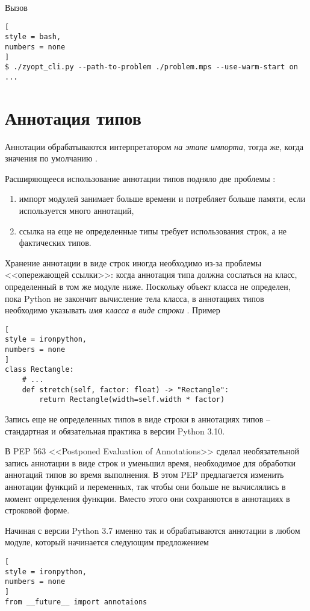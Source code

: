 \documentclass[%
	11pt,
	a4paper,
	utf8,
		]{article}
\begin{document}
Вызов
\begin{lstlisting}[
style = bash,
numbers = none
]
$ ./zyopt_cli.py --path-to-problem ./problem.mps --use-warm-start on ...
\end{lstlisting}

\section{Аннотация типов}

Аннотации обрабатываются интерпретатором \emph{на этапе импорта}, тогда же, когда значения по умолчанию \cite[]{ramalho:python-2022}.

Расширяющееся использование аннотации типов подняло две проблемы \cite{ramalho:python-2022}:
\begin{enumerate}
	\item импорт модулей занимает больше времени и потребляет больше памяти, если используется много аннотаций,
	
	\item ссылка на еще не определенные типы требует использования строк, а не фактических типов.
\end{enumerate}

Хранение аннотации в виде строк иногда необходимо из-за проблемы <<опережающей ссылки>>: когда аннотация типа должна сослаться на класс, определенный в том же модуле ниже. Поскольку объект класса не определен, пока Python не закончит вычисление тела класса, в аннотациях типов необходимо указывать \emph{имя класса в виде строки} \cite[]{ramalho:python-2022}. Пример
\begin{lstlisting}[
style = ironpython,
numbers = none
]
class Rectangle:
	# ...
	def stretch(self, factor: float) -> "Rectangle":
		return Rectangle(width=self.width * factor)
\end{lstlisting}

Запись еще не определенных типов в виде строки в аннотациях типов -- стандартная и обязательная практика в версии Python 3.10.

В PEP 563 <<Postponed Evaluation of Annotations>> сделал необязательной запись аннотации в виде строк и уменьшил время, необходимое для обработки аннотаций типов во время выполнения. В этом PEP предлагается изменить аннотации функций и переменных, так чтобы они больше не вычислялись в момент определения функции. Вместо этого они сохраняются в аннотациях в строковой форме.

Начиная с версии Python 3.7 именно так и обрабатываются аннотации в любом модуле, который начинается следующим предложением
\begin{lstlisting}[
style = ironpython,
numbers = none
]
from __future__ import annotaions
\end{lstlisting}
\end{document}
